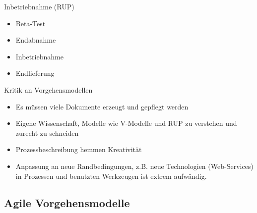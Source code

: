 \begin{bonus}{Inbetriebnahme (RUP)}
    \begin{itemize}
        \item Beta-Test
        \item Endabnahme
        \item Inbetriebnahme
        \item Endlieferung
    \end{itemize}
\end{bonus}


\begin{bonus}{Kritik an Vorgehensmodellen}
    \begin{itemize}
        \item Es müssen viele Dokumente erzeugt und gepflegt werden
        \item Eigene Wissenschaft, Modelle wie V-Modelle und RUP zu verstehen und zurecht zu schneiden
        \item Prozessbeschreibung hemmen Kreativität
        \item Anpassung an neue Randbedingungen, z.B. neue Technologien (Web-Services) in Prozessen und benutzten Werkzeugen ist extrem aufwändig.
    \end{itemize}
\end{bonus}

\subsection{Agile Vorgehensmodelle}

